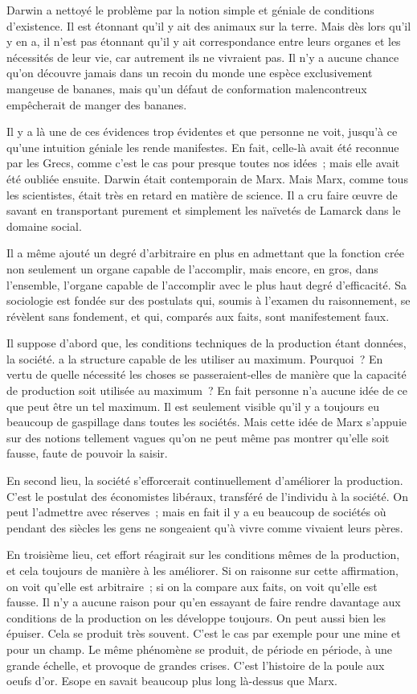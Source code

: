 \documentclass[french,twoside]{book} %
\begin{document}
Darwin a nettoyé le problème par la notion simple et géniale de conditions d'existence. Il est étonnant qu'il y ait des animaux sur la terre. Mais dès lors qu'il y en a, il n'est pas étonnant qu'il y ait correspondance entre leurs organes et les nécessités de leur vie, car autrement ils ne vivraient pas. Il n'y a aucune chance qu'on découvre jamais dans un recoin du monde une espèce exclusivement mangeuse de bananes, mais qu'un défaut de conformation malencontreux empêcherait de manger des bananes.\par
Il y a là une de ces évidences trop évidentes et que personne ne voit, jusqu'à ce qu'une intuition géniale les rende manifestes. En fait, celle-là avait été reconnue par les Grecs, comme c'est le cas pour presque toutes nos idées ; mais elle avait été oubliée ensuite. Darwin était contemporain de Marx. Mais Marx, comme tous les scientistes, était très en retard en matière de science. Il a cru faire œuvre de savant en transportant purement et simplement les naïvetés de Lamarck dans le domaine social.\par
Il a même ajouté un degré d'arbitraire en plus en admettant que la fonction crée non seulement un organe capable de l'accomplir, mais encore, en gros, dans l'ensemble, l'organe capable de l'accomplir avec le plus haut degré d'efficacité. Sa sociologie est fondée sur des postulats qui, soumis à l'examen du raisonnement, se révèlent sans fondement, et qui, comparés aux faits, sont manifestement faux.\par
Il suppose d'abord que, les conditions techniques de la production étant données, la société. a la structure capable de les utiliser au maximum. Pourquoi ? En vertu de quelle nécessité les choses se passeraient-elles de manière que la capacité de production soit utilisée au maximum ? En fait personne n'a aucune idée de ce que peut être un tel maximum. Il est seulement visible qu'il y a toujours eu beaucoup de gaspillage dans toutes les sociétés. Mais cette idée de Marx s'appuie sur des notions tellement vagues qu'on ne peut même pas montrer qu'elle soit fausse, faute de pouvoir la saisir.\par
En second lieu, la société s'efforcerait continuellement d'améliorer la production. C'est le postulat des économistes libéraux, transféré de l'individu à la société. On peut l'admettre avec réserves ; mais en fait il y a eu beaucoup de sociétés où pendant des siècles les gens ne songeaient qu'à vivre comme vivaient leurs pères.\par
En troisième lieu, cet effort réagirait sur les conditions mêmes de la production, et cela toujours de manière à les améliorer. Si on raisonne sur cette affirmation, on voit qu'elle est arbitraire ; si on la compare aux faits, on voit qu'elle est fausse. Il n'y a aucune raison pour qu'en essayant de faire rendre davantage aux conditions de la production on les développe toujours. On peut aussi bien les épuiser. Cela se produit très souvent. C'est le cas par exemple pour une mine et pour un champ. Le même phénomène se produit, de période en période, à une grande échelle, et provoque de grandes crises. C'est l'histoire de la poule aux oeufs d'or. Esope en savait beaucoup plus long là-dessus que Marx.\par
\end{document}
